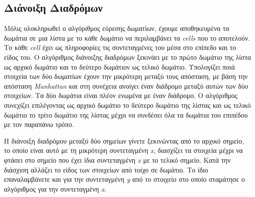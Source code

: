 \subsection{Διάνοιξη Διαδρόμων}
\par
Μόλις ολοκληρωθεί ο αλγόριθμος εύρεσης δωματίων, έχουμε αποθηκευμένα τα δωμάτια σε μια λίστα με το κάθε δωμάτιο να περιλαμβάνει τα \textit{cells} που το αποτελούν. Το κάθε \textit{cell} έχει ως πληροφορίες τις συντεταγμένες του μέσα στο επίπεδο και το είδος του. Ο αλγόριθμος διάνοιξης διαδρόμων ξεκινάει με το πρώτο δωμάτιο της λίστα ως αρχικό δωμάτιο και το δεύτερο δωμάτιον ως τελικό δωμάτιο. Υπολογίζει ποιά στοιχεία των δύο δωματίων έχουν την μικρότερη μεταξύ τους απόσταση, με βάση την απόσταση \textit{Manhattan} και στη συνέχεια ανοίγει έναν διάδρομο μεταξύ αυτών των δύο στοιχείων. Τα δύο δωμάτια είναι πλέον ενωμένα με έναν διάδρομο. Ο αλγόριθμος συνεχίζει επιλέγοντας ως αρχικό δωμάτιο το δεύτερο δωμάτιο της λίστας και ως τελικό δωμάτιο το τρίτο δωμάτιο της λίστας μέχρι να συνδέσει όλα τα δωμάτια του επιπέδου με τον παραπάνω τρόπο.
\par
H διάνοιξη διαδρόμου μεταξύ δύο σημείων γίνετε ξεκινώντας από το αρχικό σημείο, το οποίο είναι αυτό με τη μικρότερη συντεταγμένη \textit{x}, διασχίζει τα στοιχεία μέχρι να φτάσει στο σημείο που έχει ίδια συντεταγμένη \textit{x} με το τελικό σημείο. Κατά την διάσχιση αλλάζει το είδος των στοιχείων από τοίχο σε δωμάτιο. Το ίδιο επαναλαμβάνετε και για την συντεταγμένη \textit{y} από το στοιχείο στο οποίο σταμάτησε ο αλγόριθμος για την συντεταγμένη \textit{x}.

